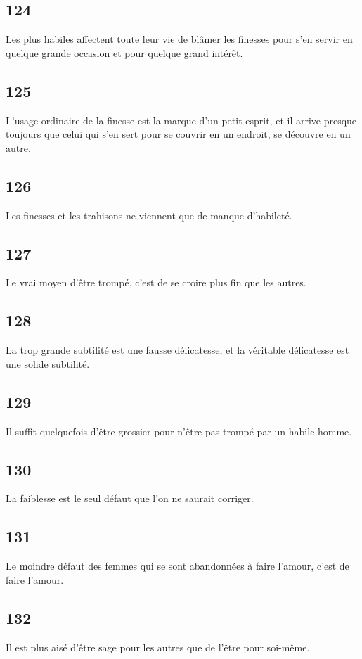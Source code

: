 \documentclass[french,twoside]{book} %
\begin{document}
\subsection[{124}]{ \textsc{124} }
\noindent Les plus habiles affectent toute leur vie de blâmer les finesses pour s’en servir en quelque grande occasion et pour quelque grand intérêt.
\subsection[{125}]{ \textsc{125} }
\noindent L’usage ordinaire de la finesse est la marque d’un petit esprit, et il arrive presque toujours que celui qui s’en sert pour se couvrir en un endroit, se découvre en un autre.
\subsection[{126}]{ \textsc{126} }
\noindent Les finesses et les trahisons ne viennent que de manque d’habileté.
\subsection[{127}]{ \textsc{127} }
\noindent Le vrai moyen d’être trompé, c’est de se croire plus fin que les autres.
\subsection[{128}]{ \textsc{128} }
\noindent La trop grande subtilité est une fausse délicatesse, et la véritable délicatesse est une solide subtilité.
\subsection[{129}]{ \textsc{129} }
\noindent Il suffit quelquefois d’être grossier pour n’être pas trompé par un habile homme.
\subsection[{130}]{ \textsc{130} }
\noindent La faiblesse est le seul défaut que l’on ne saurait corriger.
\subsection[{131}]{ \textsc{131} }
\noindent Le moindre défaut des femmes qui se sont abandonnées à faire l’amour, c’est de faire l’amour.
\subsection[{132}]{ \textsc{132} }
\noindent Il est plus aisé d’être sage pour les autres que de l’être pour soi-même.
\end{document}
